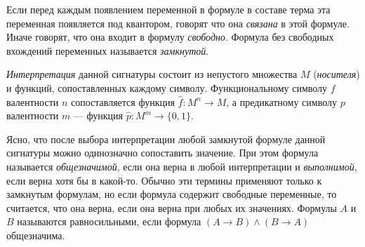 \documentclass{article}
\begin{document}
Если перед каждым появлением переменной в формуле в составе терма эта переменная появляется под квантором, говорят что она \textit{связана} в этой формуле. Иначе говорят, что она входит в формулу \textit{свободно}. Формула без свободных вхождений переменных называется \textit{замкнутой}.
\begin{definition}
	\textit{Интерпретация} данной сигнатуры состоит из непустого множества \(M\) (\textit{носителя}) и функций, сопоставленных каждому символу. Функциональному символу \(f\) валентности \(n\) сопоставляется функция \(\hat{f}:M^n \to M\), а предикатному символу \(p\) валентности \(m\) --- функция \(\hat{p}:M^m \to \{0, 1\}\).

Ясно, что после выбора интерпретации любой замкнутой формуле данной сигнатуры можно одннозначно сопоставить значение. При этом формула называется \textit{общезначимой}, если она верна в любой интерпретации и \textit{выполнимой}, если верна хотя бы в какой-то. Обычно эти термины применяют только к замкнутым формулам, но если формула содержит свободные переменные, то считается, что она верна, если она верна при любых их значениях. Формулы \(A\) и \(B\) называются равносильными, если формула \((A \to B) \land (B \to A)\) общезначима.
\end{definition}
\end{document}
